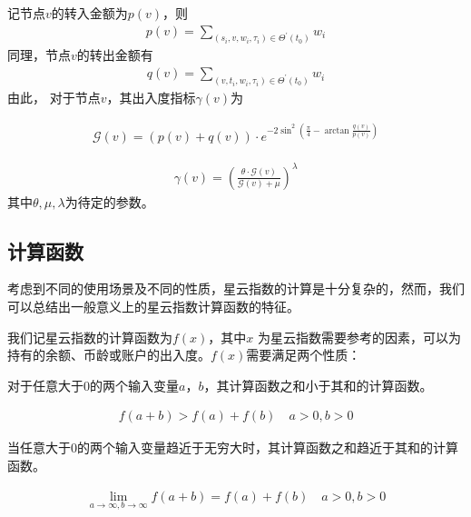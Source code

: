 
记节点$v$的转入金额为$p(v)$，则
\begin{align}
p(v) = \sum_{(s_i, v, w_i, \tau_i) \in \Theta^{\prime}(t_0)}{w_i}
\end{align}
\noindent 同理，节点$v$的转出金额有
\begin{align}
q(v) = \sum_{(v, t_i, w_i, \tau_i) \in \Theta^{\prime}(t_0)}{w_i}
\end{align}
\noindent 由此，
对于节点$v$，其出入度指标$\gamma(v)$为

\begin{align}
\mathcal{G}(v) = (p(v) + q(v)) \cdot e^{-2\sin^2{(\frac{\pi}{4} - \arctan\frac{q(v)}{p(v)})}}
\end{align}

\begin{align}
\gamma(v) = (\frac{\theta\cdot \mathcal{G}(v)}{\mathcal{G}(v) + \mu})^{\lambda}
\end{align}
\noindent 其中$\theta, \mu, \lambda$为待定的参数。

\subsection{计算函数 \label{sec:function}}
考虑到不同的使用场景及不同的性质，星云指数的计算是十分复杂的，然而，我们可以总结出一般意义上的星云指数计算函数的特征。

我们记星云指数的计算函数为\(f(x)\)，其中\(x\)
为星云指数需要参考的因素，可以为持有的余额、币龄或账户的出入度。$f(x)$需要满足两个性质：

\begin{property}
\label{prop:one}
对于任意大于$0$的两个输入变量$a$，$b$，其计算函数之和小于其和的计算函数。
\end{property}

\begin{align}
f(a+b)>f(a)+f(b) \quad a>0,b>0
\end{align}

\begin{property}
\label{prop:two}
当任意大于$0$的两个输入变量趋近于无穷大时，其计算函数之和趋近于其和的计算函数。
\end{property}

\begin{align}
\lim\limits_{a \to \infty, b\to \infty} f(a+b) = f(a) + f(b)\quad a>0, b>0
\end{align}

